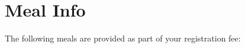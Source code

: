 \setheaders{}{}
\section{Meal Info}{}

The following meals are provided as part of your registration fee:

